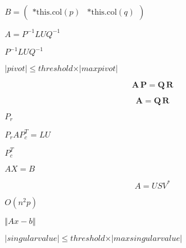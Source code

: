 \documentclass{article}
\begin{document}
$ B = \left ( \begin{array}{cc} \text{*this.col}(p) & \text{*this.col}(q) \end{array} \right ) $
\pagebreak

$ A = P^{-1} L U Q^{-1} $
\pagebreak

$ P^{-1} L U Q^{-1} $
\pagebreak

$ \vert pivot \vert \leqslant threshold \times \vert maxpivot \vert $
\pagebreak

\[ \mathbf{A} \, \mathbf{P} = \mathbf{Q} \, \mathbf{R} \]
\pagebreak

\[ \mathbf{A} = \mathbf{Q} \, \mathbf{R} \]
\pagebreak

$ P_r $
\pagebreak

$P_r A P_c^T = L U$
\pagebreak

$ P_c^T $
\pagebreak

$ A X = B $
\pagebreak

\[ A = U S V^* \]
\pagebreak

$ O(n^2p) $
\pagebreak

$ \Vert A x - b \Vert $
\pagebreak

$ \vert singular value \vert \leqslant threshold \times \vert max singular value \vert $
\pagebreak
\end{document}
